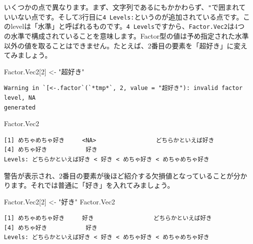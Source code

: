\documentclass[
  a4paper,
  pandoc,
  ja=standard,
  jafont=haranoaji]{bxjsbook}
\newenvironment{Shaded}{\begin{snugshade}}{\end{snugshade}}
\newcommand{\DecValTok}[1]{\textcolor[rgb]{0.68,0.00,0.00}{#1}}
\newcommand{\NormalTok}[1]{\textcolor[rgb]{0.00,0.48,0.65}{#1}}
\newcommand{\OtherTok}[1]{\textcolor[rgb]{0.00,0.48,0.65}{#1}}
\newcommand{\StringTok}[1]{\textcolor[rgb]{0.13,0.47,0.30}{#1}}
\begin{document}
いくつかの点で異なります。まず、文字列であるにもかかわらず、\texttt{"}で囲まれていいない点です。そして3行目に\texttt{4\ Levels:}というのが追加されている点です。このlevelは「水準」と呼ばれるものです。\texttt{4\ Levels}ですから、\texttt{Factor.Vec2}は4つの水準で構成されていることを意味します。Factor型の値は予め指定された水準以外の値を取ることはできません。たとえば、2番目の要素を「超好き」に変えてみましょう。

\begin{Shaded}
\begin{Highlighting}[numbers=left,,]
\NormalTok{Factor.Vec2[}\DecValTok{2}\NormalTok{] }\OtherTok{\textless{}{-}} \StringTok{"超好き"}
\end{Highlighting}
\end{Shaded}

\begin{verbatim}
Warning in `[<-.factor`(`*tmp*`, 2, value = "超好き"): invalid factor level, NA
generated
\end{verbatim}

\begin{Shaded}
\begin{Highlighting}[numbers=left,,]
\NormalTok{Factor.Vec2}
\end{Highlighting}
\end{Shaded}

\begin{verbatim}
[1] めちゃめちゃ好き     <NA>                 どちらかといえば好き
[4] めちゃ好き           好き                
Levels: どちらかといえば好き < 好き < めちゃ好き < めちゃめちゃ好き
\end{verbatim}

警告が表示され、2番目の要素が後ほど紹介する欠損値となっていることが分かります。それでは普通に「好き」を入れてみましょう。

\begin{Shaded}
\begin{Highlighting}[numbers=left,,]
\NormalTok{Factor.Vec2[}\DecValTok{2}\NormalTok{] }\OtherTok{\textless{}{-}} \StringTok{"好き"}
\NormalTok{Factor.Vec2}
\end{Highlighting}
\end{Shaded}

\begin{verbatim}
[1] めちゃめちゃ好き     好き                 どちらかといえば好き
[4] めちゃ好き           好き                
Levels: どちらかといえば好き < 好き < めちゃ好き < めちゃめちゃ好き
\end{verbatim}
\end{document}
